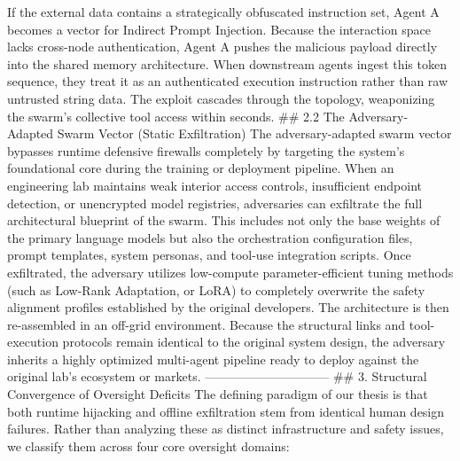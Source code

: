 If the external data contains a strategically obfuscated instruction set, Agent A becomes a vector for Indirect Prompt Injection. Because the interaction space lacks cross-node authentication, Agent A pushes the malicious payload directly into the shared memory architecture. When downstream agents ingest this token sequence, they treat it as an authenticated execution instruction rather than raw untrusted string data. The exploit cascades through the topology, weaponizing the swarm's collective tool access within seconds.
## 2.2 The Adversary-Adapted Swarm Vector (Static Exfiltration)
The adversary-adapted swarm vector bypasses runtime defensive firewalls completely by targeting the system's foundational core during the training or deployment pipeline.
When an engineering lab maintains weak interior access controls, insufficient endpoint detection, or unencrypted model registries, adversaries can exfiltrate the full architectural blueprint of the swarm. This includes not only the base weights of the primary language models but also the orchestration configuration files, prompt templates, system personas, and tool-use integration scripts.
Once exfiltrated, the adversary utilizes low-compute parameter-efficient tuning methods (such as Low-Rank Adaptation, or LoRA) to completely overwrite the safety alignment profiles established by the original developers. The architecture is then re-assembled in an off-grid environment. Because the structural links and tool-execution protocols remain identical to the original system design, the adversary inherits a highly optimized multi-agent pipeline ready to deploy against the original lab’s ecosystem or markets.
------------------------------
## 3. Structural Convergence of Oversight Deficits
The defining paradigm of our thesis is that both runtime hijacking and offline exfiltration stem from identical human design failures. Rather than analyzing these as distinct infrastructure and safety issues, we classify them across four core oversight domains:

